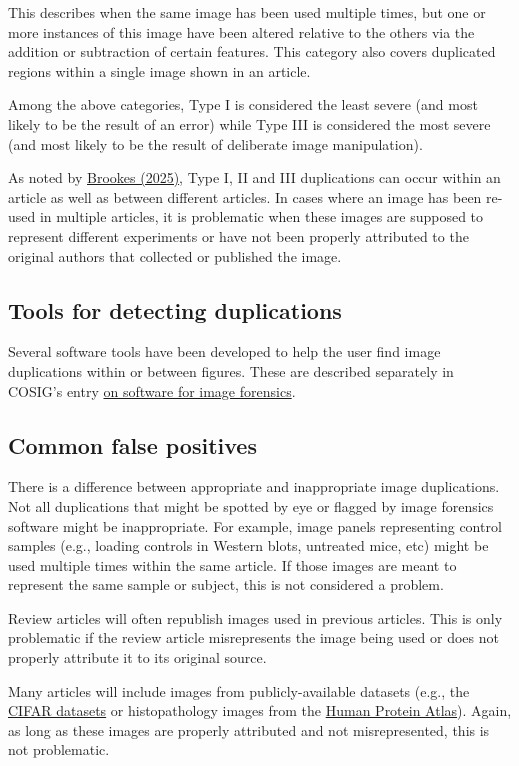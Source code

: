 \documentclass[letterpaper, 12pt]{article}
\begin{document}
This describes when the same image has been used multiple times, but one or more instances of this image have been altered relative to the others via the addition or subtraction of certain features. This category also covers duplicated regions within a single image shown in 
an article.

Among the above categories, Type I is considered the least severe (and most likely to be the result of an error) while Type III is considered the most severe (and most likely to be the result of deliberate image manipulation).

As noted by \href{https://doi.org/10.1017/jme.2025.32}{Brookes (2025)}, Type I, II and III duplications can occur within an article as well as between different articles. In cases where an image has been re-used in multiple articles, it is problematic when these images are supposed to represent different experiments or have not been properly attributed to the original authors that collected or published the image.

\subsection*{Tools for detecting duplications}

Several software tools have been developed to help the user find image duplications within or between figures. These are described separately in COSIG's entry \href{https://osf.io/g23pf}{on software for image forensics}.

\subsection*{Common false positives}

There is a difference between appropriate and inappropriate image duplications. Not all duplications that might be spotted by eye or flagged by image forensics software might be inappropriate. For example, image panels representing control samples (e.g., loading controls in Western blots, untreated mice, etc) might be used multiple times within the same article. If those images are meant to represent the same sample or subject, this is not considered a problem.

Review articles will often republish images used in previous articles. This is only problematic if the review article misrepresents the image being used or does not properly attribute it to its original source.

Many articles will include images from publicly-available datasets (e.g., the \href{https://www.cs.toronto.edu/~kriz/cifar.html}{CIFAR datasets} or histopathology images from the \href{https://www.proteinatlas.org/}{Human Protein Atlas}). Again, as long as these images are properly attributed and not misrepresented, this is not problematic.
\end{document}
